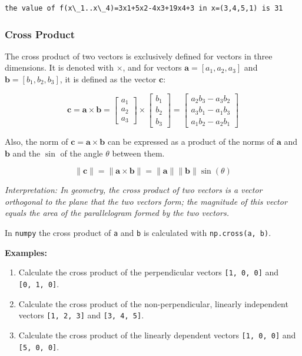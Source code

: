 \documentclass[11pt]{article}
\begin{document}
    \begin{Verbatim}[commandchars=\\\{\}]
the value of f(x\_1..x\_4)=3x1+5x2-4x3+19x4+3 in x=(3,4,5,1) is 31
    \end{Verbatim}

    \subsubsection{Cross Product}\label{cross-product}

The cross product of two vectors is exclusively defined for vectors in
three dimensions. It is denoted with \(\times\), and for vectors
\(\pmb{a} = [a_1, a_2, a_3]\) and \(\pmb{b} = [b_1, b_2, b_3]\), it is
defined as the vector \(\pmb{c}\):

\[
\pmb{c} = \pmb{a} \times \pmb{b} = \begin{bmatrix} a_1 \\ a_2 \\ a_3 \end{bmatrix} \times \begin{bmatrix} b_1 \\ b_2 \\ b_3 \end{bmatrix} = \begin{bmatrix} a_2 b_3 - a_3 b_2 \\ a_3 b_1 - a_1 b_3 \\ a_1 b_2 - a_2 b_1 \end{bmatrix}
\]

Also, the norm of \(\pmb{c} = \pmb{a} \times \pmb{b}\) can be expressed
as a product of the norms of \(\pmb{a}\) and \(\pmb{b}\) and the
\(\sin\) of the angle \(\theta\) between them.

\[
\|\pmb{c}\| = \|\pmb{a} \times \pmb{b}\| = \|\pmb{a}\| \|\pmb{b}\| \sin(\theta)
\]

\emph{Interpretation: In geometry, the cross product of two vectors is a
vector orthogonal to the plane that the two vectors form; the magnitude
of this vector equals the area of the parallelogram formed by the two
vectors.}

In \texttt{numpy} the cross product of \texttt{a} and \texttt{b} is
calculated with \texttt{np.cross(a,\ b)}.

\textbf{Examples:}

\begin{enumerate}
\def\labelenumi{\arabic{enumi}.}
\item
  Calculate the cross product of the perpendicular vectors
  \texttt{{[}1,\ 0,\ 0{]}} and \texttt{{[}0,\ 1,\ 0{]}}.
\item
  Calculate the cross product of the non-perpendicular, linearly
  independent vectors \texttt{{[}1,\ 2,\ 3{]}} and
  \texttt{{[}3,\ 4,\ 5{]}}.
\item
  Calculate the cross product of the linearly dependent vectors
  \texttt{{[}1,\ 0,\ 0{]}} and \texttt{{[}5,\ 0,\ 0{]}}.
\end{enumerate}
\end{document}

